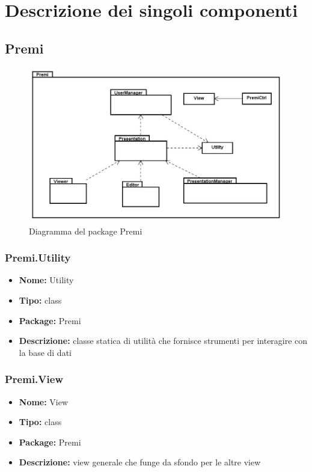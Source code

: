 \section{Descrizione dei singoli componenti}
\subsection{Premi}
\begin{figure}[h]
\begin{center}
\includegraphics[scale=0.45]{img/diapkg/vecchi/premi-class.jpg}
\caption{Diagramma del package Premi}
\end{center}
\end{figure}


\subsubsection{Premi.Utility}
\begin{itemize}
  \item[] \textbf{Nome:} Utility
  \item[] \textbf{Tipo:} class
  \item[] \textbf{Package:} Premi
  \item[] \textbf{Descrizione:} classe statica di utilità che fornisce strumenti per interagire con la base di dati
\end{itemize}

\subsubsection{Premi.View}
\begin{itemize}
  \item \textbf{Nome:} View
  \item \textbf{Tipo:} class
  \item \textbf{Package:} Premi
  \item \textbf{Descrizione:} view generale che funge da sfondo per le altre view
\end{itemize}

